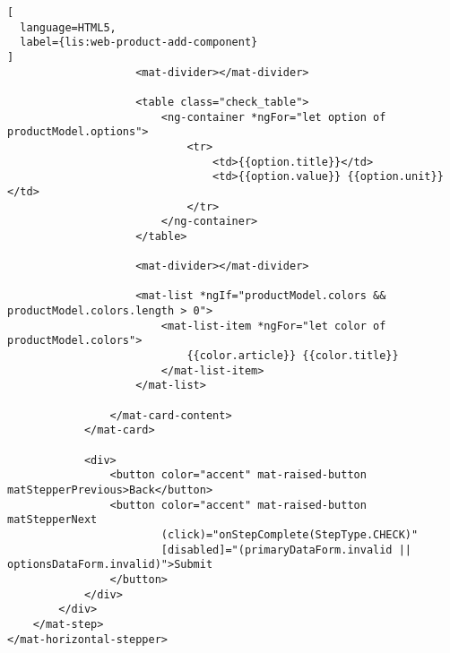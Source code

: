 \begin{lstlisting}[
  language=HTML5,
  label={lis:web-product-add-component}
]
                    <mat-divider></mat-divider>

                    <table class="check_table">
                        <ng-container *ngFor="let option of productModel.options">
                            <tr>
                                <td>{{option.title}}</td>
                                <td>{{option.value}} {{option.unit}}</td>
                            </tr>
                        </ng-container>
                    </table>

                    <mat-divider></mat-divider>

                    <mat-list *ngIf="productModel.colors && productModel.colors.length > 0">
                        <mat-list-item *ngFor="let color of productModel.colors">
                            {{color.article}} {{color.title}}
                        </mat-list-item>
                    </mat-list>

                </mat-card-content>
            </mat-card>

            <div>
                <button color="accent" mat-raised-button matStepperPrevious>Back</button>
                <button color="accent" mat-raised-button matStepperNext
                        (click)="onStepComplete(StepType.CHECK)"
                        [disabled]="(primaryDataForm.invalid || optionsDataForm.invalid)">Submit
                </button>
            </div>
        </div>
    </mat-step>
</mat-horizontal-stepper>
\end{lstlisting}